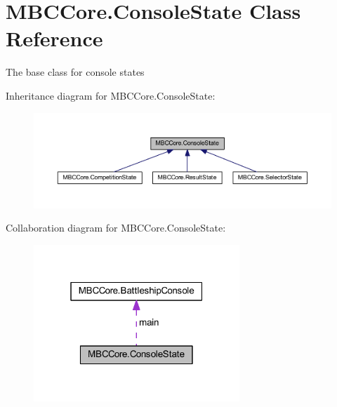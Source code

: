 \hypertarget{class_m_b_c_core_1_1_console_state}{\section{M\-B\-C\-Core.\-Console\-State Class Reference}
\label{class_m_b_c_core_1_1_console_state}
}


The base class for console states 




Inheritance diagram for M\-B\-C\-Core.\-Console\-State\-:\nopagebreak
\begin{figure}[H]
\begin{center}
\leavevmode
\includegraphics[width=350pt]{class_m_b_c_core_1_1_console_state__inherit__graph}
\end{center}
\end{figure}


Collaboration diagram for M\-B\-C\-Core.\-Console\-State\-:\nopagebreak
\begin{figure}[H]
\begin{center}
\leavevmode
\includegraphics[width=220pt]{class_m_b_c_core_1_1_console_state__coll__graph}
\end{center}
\end{figure}
